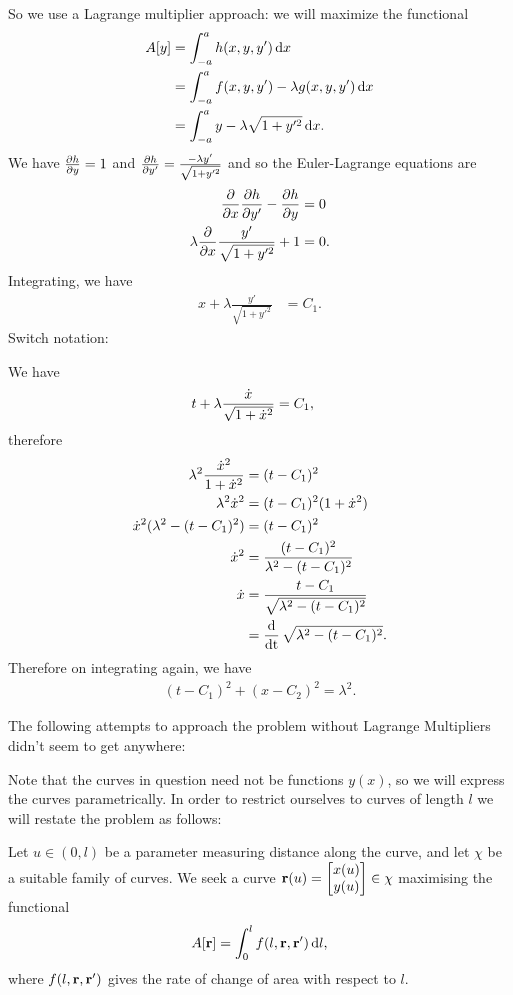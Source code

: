So we use a Lagrange multiplier approach: we will maximize the functional
\begin{align*}
  A[y]
  &= \int_{-a}^{a} h(x, y, y') \dx \\
  &= \int_{-a}^{a} f(x, y, y') - \lambda g(x, y, y') \dx \\
  &= \int_{-a}^{a} y - \lambda \sqrt{1 + y'^2} \dx.
\end{align*}
We have $\frac{\partial h}{\partial y} = 1$ and $\frac{\partial h}{\partial y'} = \frac{-\lambda y'}{\sqrt{1 + y'^2}}$ and so the Euler-Lagrange equations are
\begin{align*}
  \frac{\partial}{\partial x} \frac{\partial h}{\partial y'} - \frac{\partial h}{\partial y} &= 0 \\
  \lambda \frac{\partial}{\partial x} \frac{y'}{\sqrt{1 + y'^2}} + 1 &= 0.
\end{align*}
Integrating, we have
\begin{align*}
  x + \lambda \frac{y'}{\sqrt{1 + y'^2}} &= C_1.
\end{align*}
Switch notation:

We have
\begin{align*}
  t + \lambda \frac{\dot{x}}{\sqrt{1 + \dot{x}^2}} &= C_1,
\end{align*}
therefore
\begin{align*}
  \lambda^2 \frac{\dot{x}^2}{1 + \dot{x}^2} &= (t - C_1)^2 \\
  \lambda^2 \dot{x}^2 &= (t - C_1)^2(1 + \dot{x}^2) \\
  \dot{x}^2(\lambda^2 - (t - C_1)^2) &= (t - C_1)^2 \\
  \dot{x}^2 &= \frac{(t - C_1)^2}{\lambda^2 - (t - C_1)^2} \\
  \dot{x} &= \frac{t - C_1}{\sqrt{\lambda^2 - (t - C_1)^2}} \\
        &= \operatorname{\frac{\text{d}}{\text{dt}}} \sqrt{\lambda^2 - (t - C_1)^2}.
\end{align*}
Therefore on integrating again, we have
\begin{align*}
  (t - C_1)^2 + (x - C_2)^2 = \lambda^2.
\end{align*}

  The following attempts to approach the problem without Lagrange Multipliers didn't seem to get anywhere:

  Note that the curves in question need not be functions $y(x)$, so we will express the curves
  parametrically. In order to restrict ourselves to curves of length $l$ we will restate the problem
  as follows:

  Let $u \in (0, l)$ be a parameter measuring distance along the curve, and let $\chi$ be a suitable family of
  curves. We seek a curve $\mathbf{r}(u) = \begin{bmatrix}x(u)\\y(u)\end{bmatrix} \in \chi$ maximising the functional
\begin{align*}
  A[\r] = \int_0^l f(l, \r, \r') \d l,
\end{align*}
where $f(l, \mathbf{r}, \mathbf{r}')$ gives the rate of change of area with respect to $l$.

